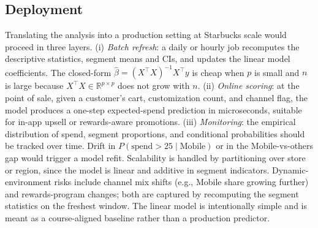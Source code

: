 \documentclass[conference,10pt]{IEEEtran}
\begin{document}
\subsection{Deployment}
Translating the analysis into a production setting at Starbucks scale would proceed in three layers. (i) \emph{Batch refresh}: a daily or hourly job recomputes the descriptive statistics, segment means and CIs, and updates the linear model coefficients. The closed\nobreakdash-form $\hat{\beta}=(X^{\top}X)^{-1}X^{\top}y$ is cheap when $p$ is small and $n$ is large because $X^{\top}X\in\mathbb{R}^{p\times p}$ does not grow with $n$. (ii) \emph{Online scoring}: at the point of sale, given a customer's cart, customization count, and channel flag, the model produces a one\nobreakdash-step expected\nobreakdash-spend prediction in microseconds, suitable for in\nobreakdash-app upsell or rewards\nobreakdash-aware promotions. (iii) \emph{Monitoring}: the empirical distribution of spend, segment proportions, and conditional probabilities should be tracked over time. Drift in $P(\text{spend}>25\mid\text{Mobile})$ or in the Mobile\nobreakdash-vs\nobreakdash-others gap would trigger a model refit. Scalability is handled by partitioning over store or region, since the model is linear and additive in segment indicators. Dynamic\nobreakdash-environment risks include channel mix shifts (e.g., Mobile share growing further) and rewards\nobreakdash-program changes; both are captured by recomputing the segment statistics on the freshest window. The linear model is intentionally simple and is meant as a course\nobreakdash-aligned baseline rather than a production predictor.
\end{document}
